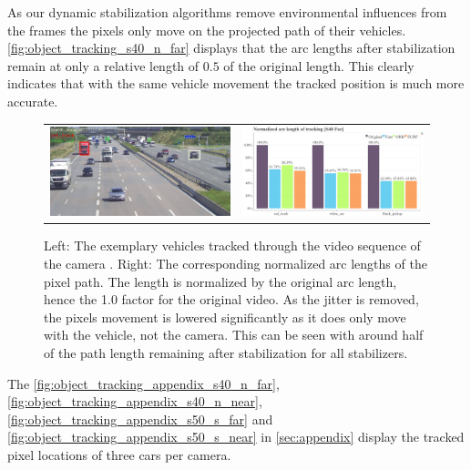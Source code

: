 As our dynamic stabilization algorithms remove environmental influences from the frames the pixels only move on the projected path of their vehicles.
\autoref{fig:object_tracking_s40_n_far} displays that the arc lengths after stabilization remain at only a relative length of $0.5$ of the original length.
This clearly indicates that with the same vehicle movement the tracked position is much more accurate.

\begin{figure}[!ht]
    \centering
    \begin{tabular}{cc}
      \includegraphics[width=0.475\linewidth]{diagrams/object_tracking/s40_n_far/frame_cropped.png}    &  
      \includegraphics[width=0.475\linewidth]{diagrams/object_tracking/s40_n_far/arcs.png}    
\end{tabular}
    \caption{Left: 
    The exemplary vehicles tracked through the video sequence of the camera . 
    Right:
    The corresponding normalized arc lengths of the pixel path. 
    The length is normalized by the original arc length, hence the 1.0 factor for the original video. 
    As the jitter is removed, the pixels movement is lowered significantly as it does only move with the vehicle, not the camera.
    This can be seen with around half of the path length remaining after stabilization for all stabilizers.
    }
    \label{fig:object_tracking_s40_n_far}
\end{figure}

The 
\autoref{fig:object_tracking_appendix_s40_n_far}, 
\autoref{fig:object_tracking_appendix_s40_n_near}, 
\autoref{fig:object_tracking_appendix_s50_s_far} and 
\autoref{fig:object_tracking_appendix_s50_s_near} in \autoref{sec:appendix} display the tracked pixel locations of three cars per camera.